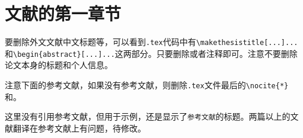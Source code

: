\documentclass{ecustbachelorthesis}
\begin{document}
\label{title:t1}

\chapter{文献的第一章节}
\begin{chatext}

要删除外文文献中文标题等，可以看到\verb$.tex$代码中有\verb$\makethesistitle[...]...$和\verb$\begin{abstract}[...]...$这两部分。只要删除或者注释即可。注意不要删除论文本身的标题和个人信息。

注意下面的参考文献，如果没有参考文献，则删除\verb$.tex$文件最后的\verb$\nocite{*}$和\verb$$。

这里没有引用参考文献，但用于示例，还是显示了\verb$参考文献$的标题。两篇以上的文献翻译在参考文献上有问题，待修改。
\end{chatext}
\nocite{*}

\clearpage
\label{title:t2}
\end{document}
